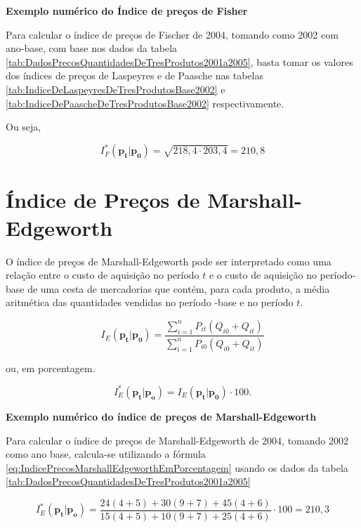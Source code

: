 \documentclass[
]{book}
\begin{document}
\textbf{Exemplo numérico do Índice de preços de Fisher}

Para calcular o índice de preços de Fischer de 2004, tomando como 2002 com ano-base, com base nos dados da tabela \ref{tab:DadosPrecosQuantidadesDeTresProdutos2001a2005}, basta tomar os valores dos índices de preços de Laspeyres e de Paasche nas tabelas \ref{tab:IndiceDeLaspeyresDeTresProdutosBase2002} e \ref{tab:IndiceDePaascheDeTresProdutosBase2002} respectivamente.

Ou seja,

\begin{equation}
  I_F^*(\mathbf{p_t}| \mathbf{p_0}) = \sqrt{218,4 \cdot 203,4} = 210,8
\end{equation}

\hypertarget{uxedndice-de-preuxe7os-de-marshall-edgeworth}{%
\section{Índice de Preços de Marshall-Edgeworth}\label{uxedndice-de-preuxe7os-de-marshall-edgeworth}}

O índice de preços de Marshall-Edgeworth pode ser interpretado como uma relação entre o custo de aquisição no período \(t\) e o custo de aquisição no período-base de uma cesta de
mercadorias que contém, para cada produto, a média aritmética das quantidades vendidas no período -base e no período \(t\).

\begin{equation}
  I_E(\mathbf{p_t}| \mathbf{p_0}) = \frac{\sum_{i=1}^{n}P_{it}(Q_{i0} +
  Q_{it})}{\sum_{i=1}^{n}P_{i0}(Q_{i0} + Q_{it})}
  \label{eq:IndicePrecosMarshallEdgeworth}
\end{equation}

ou, em porcentagem.

\begin{equation}
  I_E^*(\mathbf{p_t}|\mathbf{p_{o}}) = I_E(\mathbf{p_t}| \mathbf{p_0}) \cdot 100.
  \label{eq:IndicePrecosMarshallEdgeworthEmPorcentagem}
\end{equation}

\textbf{Exemplo numérico do índice de preços de Marshall-Edgeworth}

Para calcular o índice de preços de Marshall-Edgeworth de 2004, tomando 2002 como ano base, calcula-se utilizando a fórmula \eqref{eq:IndicePrecosMarshallEdgeworthEmPorcentagem} usando os dados da tabela \ref{tab:DadosPrecosQuantidadesDeTresProdutos2001a2005}

\begin{equation}
  I_E^* (\mathbf{p_t}|\mathbf{p_{o}}) =  \frac{24(4+5) + 30(9+7) + 45(4+6)}{15(4+5) + 10(9+7) + 25(4+6)} \cdot 100 = 210,3
\end{equation}
\end{document}
